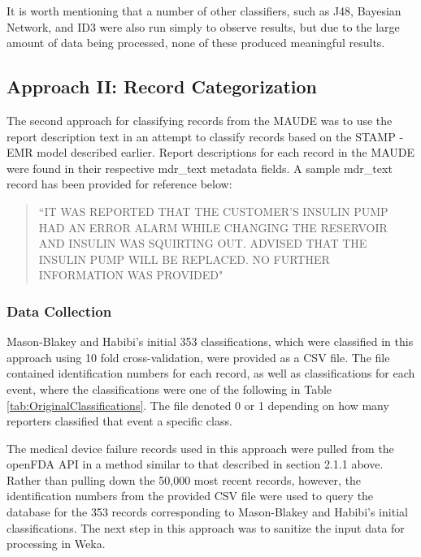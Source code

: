 \documentclass[11pt, notitlepage,abstracton,oneside]{article}   	%
\begin{document}
It is worth mentioning that a number of other classifiers, such as J48, Bayesian Network, and ID3 were also run simply to observe results, but due to the large amount of data being processed, none of these produced meaningful results. 

\subsection{Approach II: Record Categorization}
The second approach for classifying records from the MAUDE was to use the report description text in an attempt to classify records based on the STAMP - EMR model described earlier. Report descriptions for each record in the MAUDE were found in their respective mdr\_text metadata fields. A sample mdr\_text record has been provided for reference below:

\begin{quote}
``IT WAS REPORTED THAT THE CUSTOMER'S INSULIN PUMP HAD AN ERROR ALARM WHILE CHANGING THE RESERVOIR AND INSULIN WAS SQUIRTING OUT. ADVISED THAT THE INSULIN PUMP WILL BE REPLACED. NO FURTHER INFORMATION WAS PROVIDED"
\end{quote} 

\subsubsection{Data Collection}
Mason-Blakey and Habibi's initial 353 classifications, which were classified in this approach using 10 fold cross-validation, were provided as a CSV file. The file contained identification numbers for each record, as well as classifications for each event, where the classifications were one of the following in Table \ref{tab:OriginalClassifications}. The file denoted 0 or 1 depending on how many reporters classified that event a specific class.

The medical device failure records used in this approach were pulled from the openFDA API in a method similar to that described in section 2.1.1 above. Rather than pulling down the 50,000 most recent records, however, the identification numbers from the provided CSV file were used to query the database for the 353 records corresponding to Mason-Blakey and Habibi's initial classifications. The next step in this approach was to sanitize the input data for processing in Weka.
\end{document}
